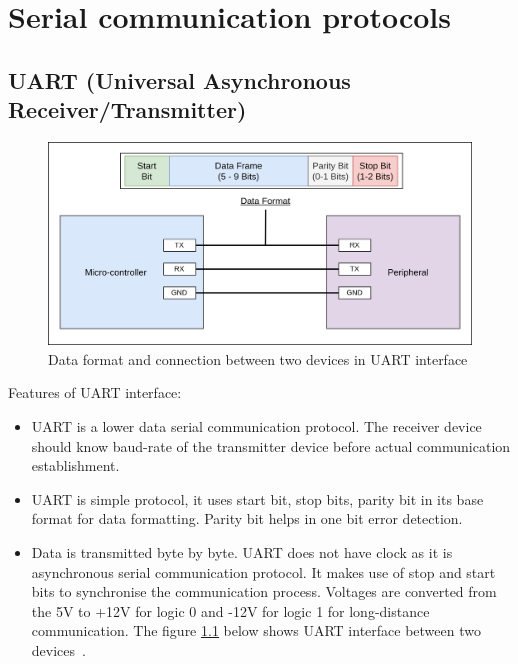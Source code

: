 \clearpage
\chapter{Serial communication protocols} \label{Basics_motor_control}

\section{UART (Universal Asynchronous Receiver/Transmitter)}

\begin{figure}[h!]
\centering
\includegraphics[width=14cm]{./Figures/UART.png}
\caption{Data format and connection between two devices in UART interface}
\label{UART}
\end{figure}

Features of UART interface:
\begin{itemize}
    \item UART is a lower data serial communication protocol. The receiver device should know baud-rate of the transmitter device before actual communication establishment.
    \item UART is simple protocol, it uses start bit, stop bits, parity bit in its base format for data formatting. Parity bit helps in one bit error detection.
    \item Data is transmitted byte by byte. UART does not have clock as it is asynchronous serial communication protocol. It makes use of stop and start bits to synchronise the communication process. Voltages are converted from the 5V to +12V for logic 0 and -12V for logic 1 for long-distance communication. The figure \ref{UART} below shows UART interface between two devices~\cite{Serial_protocols}.  
\end{itemize}

